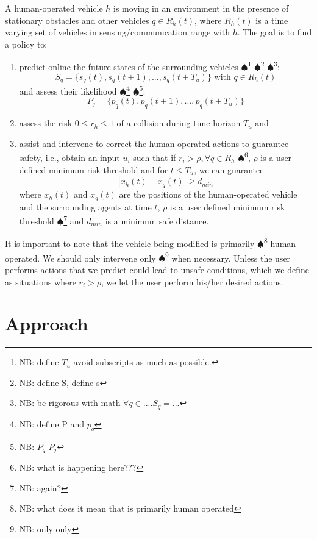 \documentclass[conference]{IEEEtran}
\newcommand\NB[1]{$\spadesuit$\footnote{NB: #1}}
\begin{document}
    A human-operated vehicle $h$ is moving in an environment in the presence of stationary obstacles and other vehicles $q \in R_h(t)$, where $R_h(t)$ is a time varying set of vehicles in sensing/communication range with $h$. The goal is to find a policy to:
    \begin{enumerate}
        \item  predict online the future states of the surrounding vehicles \NB{define $T_u$ avoid subscripts as much as possible.} \NB{define S, define s} \NB{be rigorous with math $\forall q \in ....S_q=...$}:
    \begin{equation}
    S_q=\{{s_q(t), s_q(t+1),..., s_q(t+T_u)}\} \text{ with } q \in R_h(t)
    \end{equation}
    and assess their likelihood \NB{define P and $p_q$} \NB{$P_q$ $P_j$}:
    \begin{equation}
    P_j=\{{p_q(t), p_q(t+1),..., p_q(t+T_u)}\}
    \end{equation}
    \item assess the risk $0\leq r_h \leq1$ of a collision during time horizon $T_u$ and
    \item assist and intervene to correct the human-operated actions to guarantee safety, i.e., obtain an input $u_i$ such that if $r_i>\rho, \forall q \in R_h$ \NB{what is happening here???}, $\rho$ is a user defined minimum risk threshold and for $t\leq T_u$, we can guarantee
    \begin{equation}
        |x_h(t)-x_q(t)| \geq d_{min}
    \end{equation}
     where $x_h(t)$ and $x_q(t)$ are the positions of the human-operated vehicle and the surrounding agents at time $t$, $\rho$ is a user defined minimum risk threshold \NB{again?} and $d_{min}$ is a minimum safe distance.
    \end{enumerate}
    
    It is important to note that the vehicle being modified is primarily \NB{what does it mean that is primarily human operated} human operated. We should only intervene only \NB{only only} when necessary. Unless the user performs actions that we predict could lead to unsafe conditions, which we define as situations where $r_i>\rho$, we let the user perform his/her desired actions.

\section{Approach}
\end{document}
